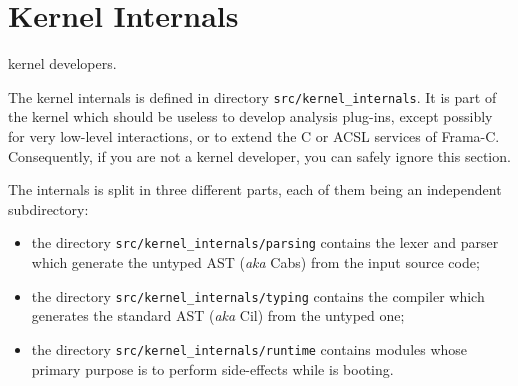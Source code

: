 
\section{Kernel Internals}\label{archi:internals}

\begin{target}kernel developers.\end{target}

The kernel internals is defined in directory \texttt{src/kernel\_internals}. It
is part of the \framac kernel which should be useless to develop analysis
plug-ins, except possibly for very low-level interactions, or to extend the
C or ACSL services of Frama-C. Consequently, if you are not a kernel
developer, you can safely ignore this section.

The internals is split in three different parts, each of them being an
independent subdirectory:
\begin{itemize}
\item the directory \texttt{src/kernel\_internals/parsing} contains the lexer
  and parser which generate the untyped AST (\emph{aka} Cabs) from the \C input
  source code;
\item the directory \texttt{src/kernel\_internals/typing} contains the
  compiler which generates the standard AST (\emph{aka} Cil) from the untyped
  one;
\item the directory \texttt{src/kernel\_internals/runtime} contains modules
  whose primary purpose is to perform side-effects while \framac is booting.
\end{itemize}

